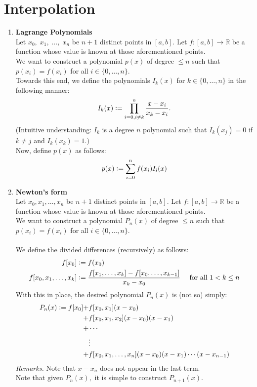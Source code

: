 \documentclass[12pt]{article}
\theoremstyle{definition}
\begin{document}
\section{Interpolation}\label{sec:inter}
\begin{enumerate}
	\itemsep1em 
	\item \textbf{Lagrange Polynomials}\\
	Let $x_0,\;x_1,\;\ldots,\;x_{n}$ be $n+1$ distinct points in $[a, b].$ Let $f:[a, b] \to \mathbb{R}$ be a function whose value is known at those aforementioned points. \\
	We want to construct a polynomial $p(x)$ of degree $\le n$ such that $p(x_i) = f(x_i)$ for all $i \in \{0, \ldots, n\}.$\\
	Towards this end, we define the polynomials $I_k(x)$ for $k \in \{0, \ldots, n\}$ in the following manner:
	\[I_k(x) \vcentcolon= \prod_{i = 0, i \neq k}^{n}\frac{x - x_i}{x_k - x_i}.\]
	(Intuitive understanding: $I_k$ is a degree $n$ polynomial such that $I_k(x_j) = 0$ if $k \neq j$ and $I_k(x_k) = 1.$)\\
	Now, define $p(x)$ as follows:
	\[p(x) \vcentcolon= \sum_{i=0}^{n}f(x_i)I_i(x)\]
	\item \textbf{Newton's form}\\
	Let $x_0, x_1, \ldots, x_n$ be $n+1$ distinct points in $[a, b].$ Let $f:[a, b] \to \mathbb{R}$ be a function whose value is known at those aforementioned points. \\
	We want to construct a polynomial $P_n(x)$ of degree $\le n$ such that $p(x_i) = f(x_i)$ for all $i \in \{0, \ldots, n\}.$\\~\\
	We define the divided differences (recursively) as follows:
	\begin{align*} 
		f[x_0] &\vcentcolon= f(x_0)\\
		f[x_0, x_1, \ldots, x_k] &\vcentcolon= \dfrac{f[x_1, \ldots, x_k] - f[x_0, \ldots, x_{k-1}]}{x_k - x_0} & \text{ for all } 1 < k \le n
	\end{align*}
	With this in place, the desired polynomial $P_n(x)$ is (not so) simply:
	\begin{align*} 
		P_n(x) \vcentcolon= f[x_0]  +& f[x_0, x_1](x - x_0)\\
						 +& f[x_0, x_1, x_2](x - x_0)(x - x_1)\\
						 +& \cdots\\
						  &\vdots\\
						 +& f[x_0, x_1, \ldots, x_n](x - x_0)(x - x_1)\cdots(x - x_{n-1})
	\end{align*}
	\emph{Remarks.} Note that $x - x_n$ does not appear in the last term.\\
	Note that given $P_n(x),$ it is simple to construct $P_{n+1}(x).$


\end{enumerate}
\end{document}

